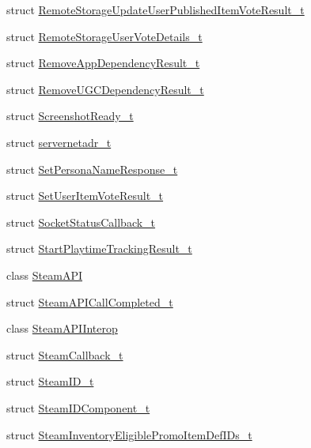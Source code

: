 \begin{DoxyCompactItemize}
\item 
struct \hyperlink{struct_valve_1_1_steamworks_1_1_remote_storage_update_user_published_item_vote_result__t}{Remote\+Storage\+Update\+User\+Published\+Item\+Vote\+Result\+\_\+t}
\item 
struct \hyperlink{struct_valve_1_1_steamworks_1_1_remote_storage_user_vote_details__t}{Remote\+Storage\+User\+Vote\+Details\+\_\+t}
\item 
struct \hyperlink{struct_valve_1_1_steamworks_1_1_remove_app_dependency_result__t}{Remove\+App\+Dependency\+Result\+\_\+t}
\item 
struct \hyperlink{struct_valve_1_1_steamworks_1_1_remove_u_g_c_dependency_result__t}{Remove\+U\+G\+C\+Dependency\+Result\+\_\+t}
\item 
struct \hyperlink{struct_valve_1_1_steamworks_1_1_screenshot_ready__t}{Screenshot\+Ready\+\_\+t}
\item 
struct \hyperlink{struct_valve_1_1_steamworks_1_1servernetadr__t}{servernetadr\+\_\+t}
\item 
struct \hyperlink{struct_valve_1_1_steamworks_1_1_set_persona_name_response__t}{Set\+Persona\+Name\+Response\+\_\+t}
\item 
struct \hyperlink{struct_valve_1_1_steamworks_1_1_set_user_item_vote_result__t}{Set\+User\+Item\+Vote\+Result\+\_\+t}
\item 
struct \hyperlink{struct_valve_1_1_steamworks_1_1_socket_status_callback__t}{Socket\+Status\+Callback\+\_\+t}
\item 
struct \hyperlink{struct_valve_1_1_steamworks_1_1_start_playtime_tracking_result__t}{Start\+Playtime\+Tracking\+Result\+\_\+t}
\item 
class \hyperlink{class_valve_1_1_steamworks_1_1_steam_a_p_i}{Steam\+A\+PI}
\item 
struct \hyperlink{struct_valve_1_1_steamworks_1_1_steam_a_p_i_call_completed__t}{Steam\+A\+P\+I\+Call\+Completed\+\_\+t}
\item 
class \hyperlink{class_valve_1_1_steamworks_1_1_steam_a_p_i_interop}{Steam\+A\+P\+I\+Interop}
\item 
struct \hyperlink{struct_valve_1_1_steamworks_1_1_steam_callback__t}{Steam\+Callback\+\_\+t}
\item 
struct \hyperlink{struct_valve_1_1_steamworks_1_1_steam_i_d__t}{Steam\+I\+D\+\_\+t}
\item 
struct \hyperlink{struct_valve_1_1_steamworks_1_1_steam_i_d_component__t}{Steam\+I\+D\+Component\+\_\+t}
\item 
struct \hyperlink{struct_valve_1_1_steamworks_1_1_steam_inventory_eligible_promo_item_def_i_ds__t}{Steam\+Inventory\+Eligible\+Promo\+Item\+Def\+I\+Ds\+\_\+t}

\end{DoxyCompactItemize}

